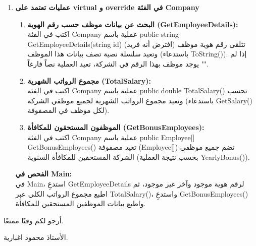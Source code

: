\documentclass[14pt]{extarticle}
\begin{document}
\begin{enumerate}[label=\textbf{تمرين \arabic*:}, wide=0pt, itemsep=2.2em]
    \item \textbf{عمليات تعتمد على \textenglish{virtual} و \textenglish{override} في الفئة \textenglish{Company}}
    \begin{enumerate}[label=\textbf{(\arabic*)}]
        \item \textbf{البحث عن بيانات موظف حسب رقم الهوية (\textenglish{GetEmployeeDetails}):} \\
        اكتب في الفئة \textenglish{Company} عملية باسم \textenglish{public string GetEmployeeDetails(string id)} تتلقى رقم هوية موظف (افترض أنه فريد) وتعيد سلسلة نصية تصف بيانات هذا الموظف (باستدعاء \textenglish{ToString()}). إذا لم يوجد موظف بهذا الرقم في الشركة، تعيد العملية نصاً فارغاً \textenglish{""}.
        \item \textbf{مجموع الرواتب الشهرية (\textenglish{TotalSalary}):} \\
        اكتب في الفئة \textenglish{Company} عملية باسم \textenglish{public double TotalSalary()} تحسب وتعيد مجموع الرواتب الشهرية لجميع موظفي الشركة (باستدعاء \textenglish{GetSalary()} لكل موظف في المصفوفة).
        \item \textbf{الموظفون المستحقون للمكافأة (\textenglish{GetBonusEmployees}):} \\
        اكتب في الفئة \textenglish{Company} عملية باسم \textenglish{public Employee[] GetBonusEmployees()} تعيد مصفوفة (\textenglish{Employee[]}) تضم جميع موظفي الشركة المستحقين للمكافأة السنوية (بحسب نتيجة العملية \textenglish{YearlyBonus()}).
    \end{enumerate}
    \textbf{الفحص في \textenglish{Main}:} \\
    في \textenglish{Main}، استدعِ \textenglish{GetEmployeeDetails} لرقم هوية موجود وآخر غير موجود، ثم اطبع مجموع الرواتب الكلي عبر \textenglish{TotalSalary()}، واستدعِ \textenglish{GetBonusEmployees()} واطبع بيانات الموظفين المستحقين للمكافأة.
    \filbreak

\end{enumerate}

\vspace{1cm}
\begin{flushleft}
أرجو لكم وقتًا ممتعًا.

الأستاذ محمود اغبارية.
\end{flushleft}
\end{document}

